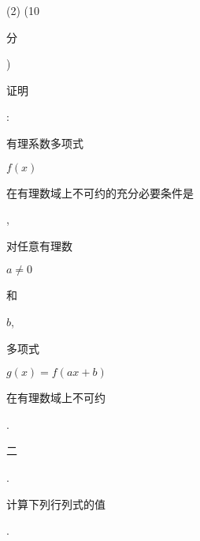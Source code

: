 \documentclass[10pt]{article}
\begin{document}
(2) (10 \begin{CJK}{UTF8}{mj}分\end{CJK}) \begin{CJK}{UTF8}{mj}证明\end{CJK}: \begin{CJK}{UTF8}{mj}有理系数多项式\end{CJK} $f(x)$ \begin{CJK}{UTF8}{mj}在有理数域上不可约的充分必要条件是\end{CJK}, \begin{CJK}{UTF8}{mj}对任意有理数\end{CJK} $a \neq 0$ \begin{CJK}{UTF8}{mj}和\end{CJK} $b$, \begin{CJK}{UTF8}{mj}多项式\end{CJK} $g(x)=f(a x+b)$ \begin{CJK}{UTF8}{mj}在有理数域上不可约\end{CJK}.

\begin{CJK}{UTF8}{mj}二\end{CJK}. \begin{CJK}{UTF8}{mj}计算下列行列式的值\end{CJK}.
\end{document}

